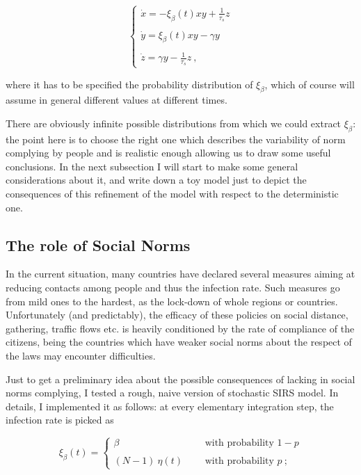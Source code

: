 \documentclass{article}
\begin{document}
\begin{equation}
\left\{
\begin{array}{l}
\dot x = -\xi_\beta(t) xy + \frac{1}{\tau_s}z\\
\ \\
\dot y = \xi_\beta(t) xy -\gamma y \\
\ \\
\dot z = \gamma y - \frac{1}{\tau_s}z \ ,
\end{array}
\right.
    \label{stoch}
\end{equation}

\noindent where it has to be specified the probability distribution of $\xi_\beta$, which of course will assume in general different values at different times.

There are obviously infinite possible distributions from which we could extract $\xi_\beta$: the point here is to choose the right one which describes the variability of norm complying by people and is realistic enough allowing us to draw some useful conclusions. In the next subsection I will start to make some general considerations about it, and write down a toy model just to depict the consequences of this refinement of the model with respect to the deterministic one.

\subsection*{The role of Social Norms}

In the current situation, many countries have declared several measures aiming at reducing contacts among people and thus the infection rate. Such measures go from mild ones to the hardest, as the lock-down of whole regions or countries. Unfortunately (and predictably), the efficacy of these policies on social distance, gathering, traffic flows etc. is heavily conditioned by the rate of compliance of the citizens, being the countries which have weaker social norms about the respect of the laws may encounter difficulties.

Just to get a preliminary idea about the possible consequences of lacking in social norms complying, I tested a rough, naive version of stochastic SIRS model. In details, I implemented it as follows: at every elementary integration step, the infection rate is picked as

\begin{equation}
\xi_\beta(t)=
\left\{
\begin{array}{lcl}
\beta & \ \ \  & \mbox{with probability $1-p$} \\
\ & \ & \ \\
(N-1)\ \eta(t) & \ \ \  & \mbox{with probability $p$} \ ; 
\end{array}
\right.
    \label{st_b}
\end{equation}
\end{document}
